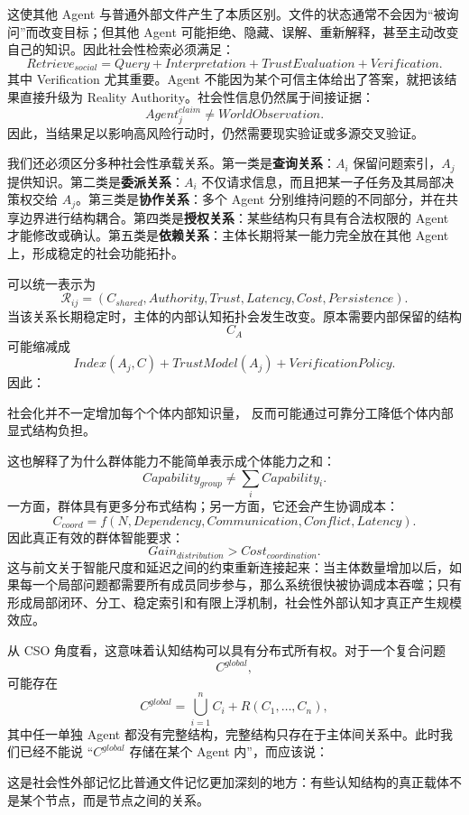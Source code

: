 这使其他 Agent 与普通外部文件产生了本质区别。文件的状态通常不会因为``被询问''而改变目标；但其他 Agent 可能拒绝、隐藏、误解、重新解释，甚至主动改变自己的知识。因此社会性检索必须满足：
\[
Retrieve_{social}
=
Query
+
Interpretation
+
TrustEvaluation
+
Verification.
\]
其中 Verification 尤其重要。Agent 不能因为某个可信主体给出了答案，就把该结果直接升级为 Reality Authority。社会性信息仍然属于间接证据：
\[
Agent_j^{claim}
\neq
WorldObservation.
\]
因此，当结果足以影响高风险行动时，仍然需要现实验证或多源交叉验证。

我们还必须区分多种社会性承载关系。第一类是\textbf{查询关系}：$A_i$ 保留问题索引，$A_j$ 提供知识。第二类是\textbf{委派关系}：$A_i$ 不仅请求信息，而且把某一子任务及其局部决策权交给 $A_j$。第三类是\textbf{协作关系}：多个 Agent 分别维持问题的不同部分，并在共享边界进行结构耦合。第四类是\textbf{授权关系}：某些结构只有具有合法权限的 Agent 才能修改或确认。第五类是\textbf{依赖关系}：主体长期将某一能力完全放在其他 Agent 上，形成稳定的社会功能拓扑。

可以统一表示为
\[
\mathcal R_{ij}
=
(
C_{shared},
Authority,
Trust,
Latency,
Cost,
Persistence
).
\]
当该关系长期稳定时，主体的内部认知拓扑会发生改变。原本需要内部保留的结构
\[
C_A
\]
可能缩减成
\[
Index(A_j,C)
+
TrustModel(A_j)
+
VerificationPolicy.
\]
因此：
\begin{statementbox}
社会化并不一定增加每个个体内部知识量，
反而可能通过可靠分工降低个体内部显式结构负担。
\end{statementbox}

这也解释了为什么群体能力不能简单表示成个体能力之和：
\[
Capability_{group}
\neq
\sum_i Capability_i.
\]
一方面，群体具有更多分布式结构；另一方面，它还会产生协调成本：
\[
C_{coord}
=
f(
N,
Dependency,
Communication,
Conflict,
Latency
).
\]
因此真正有效的群体智能要求：
\[
Gain_{distribution}
>
Cost_{coordination}.
\]
这与前文关于智能尺度和延迟之间的约束重新连接起来：当主体数量增加以后，如果每一个局部问题都需要所有成员同步参与，那么系统很快被协调成本吞噬；只有形成局部闭环、分工、稳定索引和有限上浮机制，社会性外部认知才真正产生规模效应。

从 CSO 角度看，这意味着认知结构可以具有分布式所有权。对于一个复合问题
\[
C^{global},
\]
可能存在
\[
C^{global}
=
\bigcup_{i=1}^{n}
C_i
+
R(C_1,\ldots,C_n),
\]
其中任一单独 Agent 都没有完整结构，完整结构只存在于主体间关系中。此时我们已经不能说 ``$C^{global}$ 存储在某个 Agent 内''，而应该说：
\begin{statementbox}
\centering
{}
\end{statementbox}
这是社会性外部记忆比普通文件记忆更加深刻的地方：有些认知结构的真正载体不是某个节点，而是节点之间的关系。

